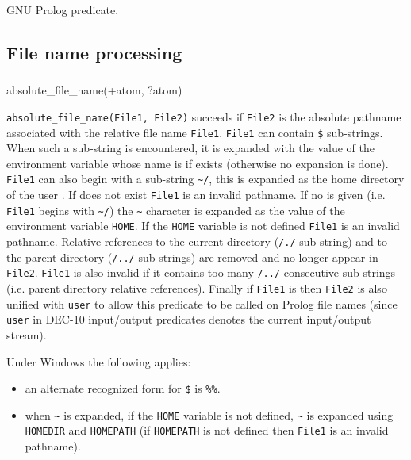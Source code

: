 \Portability

GNU Prolog predicate.

\subsection{File name processing}

\subsubsection{\label{absolute-file-name/2}}

\begin{TemplatesOneCol}
absolute\_file\_name(+atom, ?atom)

\end{TemplatesOneCol}

\Description

\texttt{absolute\_file\_name(File1, File2)} succeeds if \texttt{File2} is
the absolute pathname associated with the relative file name \texttt{File1}.
\texttt{File1} can contain \texttt{\$} sub-strings. When
such a sub-string is encountered, it is expanded with the value of the
environment variable whose name is  if exists
(otherwise no expansion is done). \texttt{File1} can also begin with a
sub-string \texttt{\~{}/}, this is expanded as the home
directory of the user . If
 does not exist \texttt{File1} is an invalid
pathname. If no  is given (i.e. \texttt{File1}
begins with \texttt{\~{}/}) the \texttt{\~{}} character is expanded as the
value of the environment variable \texttt{HOME}. If the \texttt{HOME}
variable is not defined \texttt{File1} is an invalid pathname. Relative
references to the current directory (\texttt{/./} sub-string) and to the
parent directory (\texttt{/../} sub-strings) are removed and no longer
appear in \texttt{File2}. \texttt{File1} is also invalid if it contains too
many \texttt{/../} consecutive sub-strings (i.e. parent directory relative
references). Finally if \texttt{File1} is  then \texttt{File2}
is also unified with \texttt{user} to allow this predicate to be called on
Prolog file names (since \texttt{user} in DEC-10 input/output predicates
denotes the current input/output stream).

Under Windows the following applies: 
\begin{itemize}
\item an alternate recognized form for \texttt{\$} is
  \texttt{\%\%}. 

\item when \texttt{\~{}} is expanded, if the \texttt{HOME} variable is not defined, \texttt{\~{}} is expanded using \texttt{HOMEDIR} and
  \texttt{HOMEPATH} (if \texttt{HOMEPATH} is not defined then \texttt{File1}
  is an invalid pathname).
\end{itemize}


